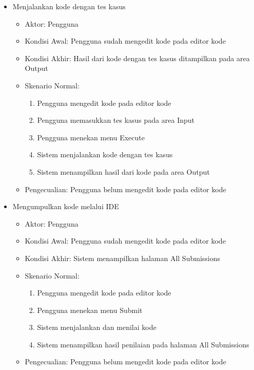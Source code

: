 \begin{itemize}
    
    \item Menjalankan kode dengan tes kasus
        \begin{itemize}
            \item Aktor: Pengguna
            \item Kondisi Awal: Pengguna sudah mengedit kode pada editor kode
            \item Kondisi Akhir: Hasil dari kode dengan tes kasus ditampilkan pada area Output
            \item Skenario Normal:
                \begin{enumerate}
                    \item Pengguna mengedit kode pada editor kode
                    \item Pengguna memasukkan tes kasus pada area Input
                    \item Pengguna menekan menu Execute
                    \item Sistem menjalankan kode dengan tes kasus
                    \item Sistem menampilkan hasil dari kode pada area Output
                \end{enumerate}
            \item Pengecualian:  Pengguna belum mengedit kode pada editor kode
        \end{itemize}
    
    
    \item Mengumpulkan kode melalui IDE
        \begin{itemize}
            \item Aktor: Pengguna
            \item Kondisi Awal: Pengguna sudah mengedit kode pada editor kode
            \item Kondisi Akhir: Sistem menampilkan halaman All Submissions
            \item Skenario Normal:
                \begin{enumerate}
                    \item Pengguna mengedit kode pada editor kode
                    \item Pengguna menekan menu Submit
                    \item Sistem menjalankan dan menilai kode
                    \item Sistem menampilkan hasil penilaian pada halaman All Submissions 
                \end{enumerate}
            \item Pengecualian:  Pengguna belum mengedit kode pada editor kode
        \end{itemize}
\end{itemize}